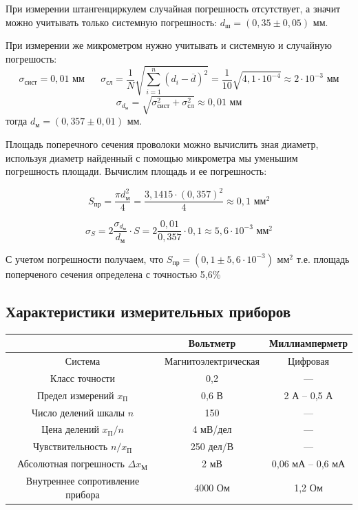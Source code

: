 \documentclass[a4paper, 12pt]{article}
\begin{document}
	При измерении штангенциркулем случайная погрешность отсутствует, а значит можно учитывать только системную погрешность: $d_\text{ш} = \left( 0,35 \pm 0,05 \right) \text{ мм}$.

	При измерении же микрометром нужно учитывать и системную и случайную погрешость:
	$$\sigma_\text{сист}=0,01\text{ мм}\;\;\;\;\;\; \sigma_\text{сл}=\frac{1}{N} \sqrt{\sum_{i=1}^{n}(d_i - \overline{d})^2}=\frac{1}{10} \sqrt{4,1\cdot 10^{-4}}\approx 2\cdot 10^{-3} \text{ мм}$$
	$$\sigma_{d_\text{м}} = \sqrt{\sigma_\text{сист}^2+\sigma_\text{сл}^2}\approx 0,01 \text{ мм}$$
	\noindent тогда $d_\text{м} = \left( 0,357 \pm 0,01 \right) \text{ мм}$.
	
	Площадь поперечного сечения проволоки можно вычислить зная диаметр, используя диаметр найденный с помощью микрометра мы уменьшим погрешность площади. Вычислим площадь и ее погрешность:
	
	\begin{equation}
		S_\text{пр} = \frac{\pi d_\text{м}^2}{4} = \frac{3,1415\cdot (0,357)^2}{4} \approx 0,1 \text{ мм}^2
	\end{equation}
	
	\begin{equation}
		\sigma_S = 2\frac{\sigma_{d_\text{м}}}{d_\text{м}}\cdot S = 2\frac{0,01}{0,357} \cdot 0,1 \approx 5,6\cdot 10^{-3} \text{ мм}^2
	\end{equation}

	С учетом погрешности получаем, что $S_\text{пр} = \left( 0,1 \pm 5,6 \cdot 10^{-3}\right) \text{ мм}^2$ т.е. площадь поперченого сечения определена с точностью 5,6\%
	
	\subsection{Характеристики измерительных приборов}
	\begin{longtable}[H]{|c|c|c|}
		\hline
		& Вольтметр & Миллиамперметр\\
		\hline
		Система & Магнитоэлектрическая & Цифровая \\
		Класс точности & 0,2 & --- \\
		Предел измерений $x_\text{П}$ & 0,6 В & 2 А -- 0,5 А\\
		Число делений шкалы $n$ & 150 & ---\\
		Цена делений $x_\text{П}/n$ & 4 мВ/дел & ---\\
		Чувствительность $n/x_\text{П}$ & 250 дел/В & --- \\
		Абсолютная погрешность $\Delta x_\text{М}$ & 2 мВ & 0,06 мА -- 0,6 мА\\
		Внутреннее сопротивление прибора & 4000 Ом & 1,2 Ом \\
		\hline
	\end{longtable}
\end{document}
